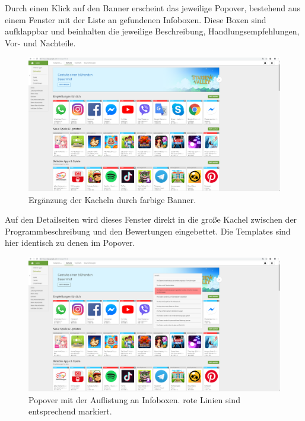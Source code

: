 Durch einen Klick auf den Banner erscheint das jeweilige Popover, bestehend aus einem Fenster mit der Liste an gefundenen Infoboxen. Diese Boxen sind aufklappbar und beinhalten die jeweilige Beschreibung, Handlungsempfehlungen, Vor- und Nachteile.

\begin{figure}[h]
	\centering
	\includegraphics[width=1\textwidth]{pics/ergebnis1.png}
	\caption{Ergänzung der Kacheln durch farbige Banner.}
	\label{ergebnis1}
\end{figure}

Auf den Detailseiten wird dieses Fenster direkt in die große Kachel zwischen der Programmbeschreibung und den Bewertungen eingebettet. Die Templates sind hier identisch zu denen im Popover.

\begin{figure}[h]
	\centering
	\includegraphics[width=1\textwidth]{pics/ergebnis2.png}
	\caption{Popover mit der Auflistung an Infoboxen. \glqq rote Linien \grqq{} sind entsprechend markiert.}
	\label{ergebnis2}
\end{figure}

